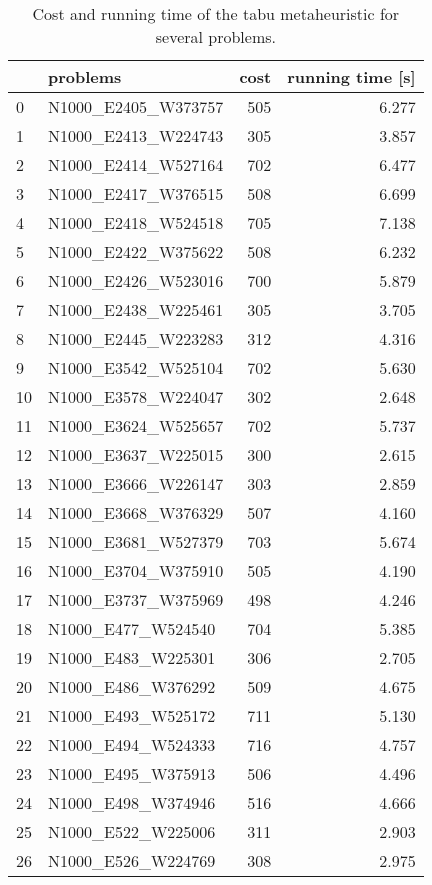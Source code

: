 \begin{table}[H]
\centering
\begin{tabular}{llrr}
\toprule
{} &             problems &  cost &  running time [s] \\
\midrule
0  &  N1000\_E2405\_W373757 &   505 &             6.277 \\
1  &  N1000\_E2413\_W224743 &   305 &             3.857 \\
2  &  N1000\_E2414\_W527164 &   702 &             6.477 \\
3  &  N1000\_E2417\_W376515 &   508 &             6.699 \\
4  &  N1000\_E2418\_W524518 &   705 &             7.138 \\
5  &  N1000\_E2422\_W375622 &   508 &             6.232 \\
6  &  N1000\_E2426\_W523016 &   700 &             5.879 \\
7  &  N1000\_E2438\_W225461 &   305 &             3.705 \\
8  &  N1000\_E2445\_W223283 &   312 &             4.316 \\
9  &  N1000\_E3542\_W525104 &   702 &             5.630 \\
10 &  N1000\_E3578\_W224047 &   302 &             2.648 \\
11 &  N1000\_E3624\_W525657 &   702 &             5.737 \\
12 &  N1000\_E3637\_W225015 &   300 &             2.615 \\
13 &  N1000\_E3666\_W226147 &   303 &             2.859 \\
14 &  N1000\_E3668\_W376329 &   507 &             4.160 \\
15 &  N1000\_E3681\_W527379 &   703 &             5.674 \\
16 &  N1000\_E3704\_W375910 &   505 &             4.190 \\
17 &  N1000\_E3737\_W375969 &   498 &             4.246 \\
18 &   N1000\_E477\_W524540 &   704 &             5.385 \\
19 &   N1000\_E483\_W225301 &   306 &             2.705 \\
20 &   N1000\_E486\_W376292 &   509 &             4.675 \\
21 &   N1000\_E493\_W525172 &   711 &             5.130 \\
22 &   N1000\_E494\_W524333 &   716 &             4.757 \\
23 &   N1000\_E495\_W375913 &   506 &             4.496 \\
24 &   N1000\_E498\_W374946 &   516 &             4.666 \\
25 &   N1000\_E522\_W225006 &   311 &             2.903 \\
26 &   N1000\_E526\_W224769 &   308 &             2.975 \\
\bottomrule
\end{tabular}
\caption{Cost and running time of the tabu metaheuristic for several problems.}
\label{table:tabu-large-results}
\end{table}

